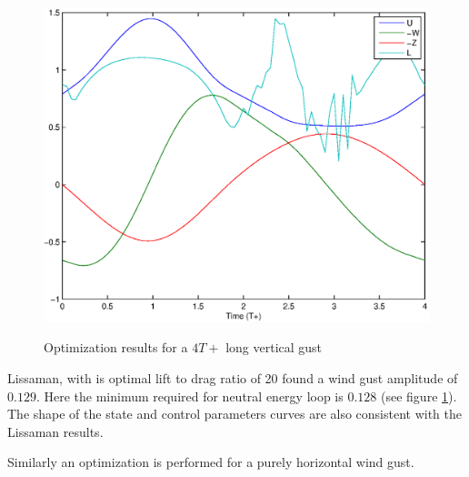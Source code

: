 \begin{figure}[ht]
	\begin{center}	
	\scalebox{0.8}
	{\includegraphics{./Figures/Windtype=1_Tg=4_Wg=0p129_quad_G=20.eps}}
	\end{center}
	\caption{Optimization results for a $4T+$ long vertical gust}
	\label{fig:Validation_optimization}
\end{figure}

\FloatBarrier

Lissaman, with is optimal lift to drag ratio of 20 found a wind gust amplitude of $0.129$. 
Here the minimum required for neutral energy loop is $0.128$ (see figure \ref{fig:Validation_optimization}).
The shape of the state and control parameters curves are also consistent with the Lissaman results.

\par Similarly an optimization is performed for a purely horizontal wind gust.

